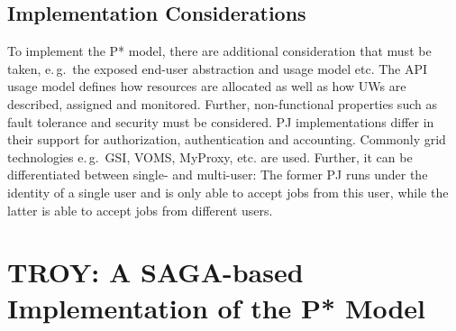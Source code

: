 \documentclass[conference,final]{IEEEtran}
\newcommand{\jhanote}[1]{ {\textcolor{red} { ***shantenu: #1 }}}
\newcommand{\msnote}[1]{ {\textcolor{cyan} { ***mark: #1 }}}
\newcommand{\jhanote}[1]{}
\newcommand{\msnote}[1]{}
\newcommand{\upp}{\vspace*{-0.5em}}
\begin{document}
\subsection{Implementation Considerations\upp\upp}




To implement the P* model, there are additional consideration that must be
taken, e.\,g.\ the exposed end-user abstraction and usage model etc. The API
usage model defines how resources are allocated as well as how UWs are
described, assigned and monitored. Further, non-functional properties such as
fault tolerance and security must be considered. PJ implementations differ in
their support for authorization, authentication and accounting. Commonly grid
technologies e.\,g.\ GSI, VOMS, MyProxy, etc. are used. Further, it can be
differentiated between single- and multi-user: The former PJ runs under the
identity of a single user and is only able to accept jobs from this user, while
the latter is able to accept jobs from different users.



\section{TROY: A SAGA-based Implementation of the P* Model\upp\upp}


\end{document}
